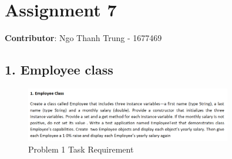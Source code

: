 \documentclass{article}
\begin{document}
\section*{Assignment 7}

\textbf{Contributor}: Ngo Thanh Trung - 1677469

\subsection*{1. Employee class}

\begin{figure}[H]
    \centering
    \includegraphics[width=0.8\textwidth]{./Assets/Task requirements/Assignment7/1.png}
    \caption{Problem 1 Task Requirement}
\end{figure}
\end{document}

